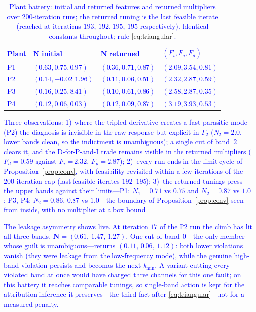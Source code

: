 \documentclass[final,3p,times,twocolumn]{elsarticle}
\newcommand{\reve}[1]{\textcolor{blue}{#1}} %
\begin{document}
\begin{table}[t]
\centering\small
\caption{\reve{Plant battery: initial and returned features and
returned multipliers over $200$-iteration runs; the returned tuning is
the last feasible iterate (reached at iterations $193$, $192$, $195$,
$195$ respectively). Identical constants throughout; rule
\eqref{eq:triangular}.}}
\label{tab:battery}
\reve{\begin{tabular}{llll}
\toprule
Plant & $\mathbf N$ initial & $\mathbf N$ returned & $(F_i, F_p, F_d)$ \\
\midrule
P1 &
$(0.63, 0.75, 0.97)$ & $(0.36, 0.71, 0.87)$ & $(2.09, 3.54, 0.81)$ \\
P2 &
$(0.14, -0.02, 1.96)$ & $(0.11, 0.06, 0.51)$ & $(2.32, 2.87, 0.59)$ \\
P3 &
$(0.16, 0.25, 8.41)$ & $(0.10, 0.61, 0.86)$ & $(2.58, 2.87, 0.35)$ \\
P4 &
$(0.12, 0.06, 0.03)$ & $(0.12, 0.09, 0.87)$ & $(3.19, 3.93, 0.53)$ \\
\bottomrule
\end{tabular}}
\end{table}

\reve{Three observations: 1)~where the tripled derivative creates a
fast parasitic mode (P2) the diagnosis is invisible in the raw
response but explicit in $\Gamma_2$ ($N_2 = 2.0$, lower bands clean,
so the indictment is unambiguous); a single cut of band~$2$ clears it,
and the D-for-P-and-I trade remains visible in the returned
multipliers ($F_d = 0.59$ against $F_i = 2.32$, $F_p = 2.87$);
2)~every run ends in the limit cycle of
Proposition~\ref{prop:conv}, with feasibility revisited within a few
iterations of the $200$-iteration cap (last feasible iterates
$192$--$195$); 3)~the returned tunings press the upper bands against
their limits---P1: $N_1 = 0.71$ vs $0.75$ and $N_2 = 0.87$ vs $1.0$;
P3, P4: $N_2 = 0.86$, $0.87$ vs $1.0$---the boundary of
Proposition~\ref{prop:conv} seen from inside, with no multiplier at a
box bound.}

\reve{The leakage asymmetry shows live. At iteration $17$ of the P2
run the climb has lit all three bands,
$\mathbf N = (0.61,\, 1.47,\, 1.27)$. One cut of band~$0$---the only
member whose guilt is unambiguous---returns
$(0.11,\, 0.06,\, 1.12)$: both lower violations vanish (they were
leakage from the low-frequency mode), while the genuine high-band
violation persists and becomes the next $k_{\min}$. A variant cutting
every violated band at once would have charged three channels for this
one fault; on this battery it reaches comparable tunings, so
single-band action is kept for the attribution inference it
preserves---the third fact after \eqref{eq:triangular}---not for a
measured penalty.}
\end{document}
